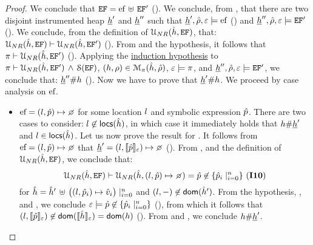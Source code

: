 \begin{proof}
\noindent{} We conclude that $\mathtt{EF} = \mathtt{\text{ef}} \, \uplus \, \mathtt{EF}'$ (). 
We conclude, from , that there are two disjoint instrumented heap $\underline{h}'$ and $\underline{h}''$ 
such that $\underline{h}', \hat\rho, \varepsilon \models \mathtt{\text{ef}}$ () and  $\underline{h}'', \hat\rho, \varepsilon \models \mathtt{EF}'$ (). 
%
We conclude, from the definition 
of ${\cal U}_{NR}(\hat{h}, \mathtt{EF})$, that: ${\cal U}_{NR}(\hat{h}, \mathtt{EF}) \vdash {\cal U}_{NR}(\hat{h}, \mathtt{EF}')$ ().
From  and the hypothesis, it follows that $\pi \vdash {\cal U}_{NR}(\hat{h}, \mathtt{EF}')$ (). 
Applying the \underline{induction hypothesis} to $\pi \vdash {\cal U}_{NR}(\hat{h}, \mathtt{EF}') \, \wedge \,  {\cal S}(\mathtt{EF})$, 
$(h, \rho) \in \mathcal{M}_{\pi}(\hat{h}, \hat\rho)$, $\varepsilon \models \pi$, and 
$\underline{h}'', \hat\rho, \varepsilon \models \mathtt{EF}'$, we conclude that: $\underline{h}'' \# h$ (). 
Now we have to prove that $\underline{h}' \# h$. 
We proceed by case analysis on $\mathtt{\text{ef}}$.  
\begin{itemize}
   \item $\efa = (\loc,\sexprp)\pointsto \none$ for some location $l$ and symbolic expression $\hat{p}$. 
   	    There are two cases to consider:  $l \not\in {\sf locs}(\hat{h})$, in which case 
	    it immediately holds that $h \# \underline{h}'$ and  $l \in {\sf locs}(\hat{h})$. 
	    Let us now prove the result for . 
	    It follows from $\efa = (\loc,\sexprp)\pointsto \none$ that $\iheap' = (\loc, \symbeval{\sexprp}{\senv}) \mapsto \none$ (). 
	    From , and the definition of ${\cal U}_{NR}(\hat{h}, \mathtt{EF})$, 
	    we conclude that: 
	    $$
	       \unificationef{\sheap}{\efs} \vdash \unificationefl{\sheap}{(\loc,\sexprp)\pointsto \none} = \sexprp \not\in \{  \sexprp_i \mid_{i = 0}^n \} \text{ (\ieq{10})} 
	    $$
	    for $\hat{h} = \hat{h}' \, \uplus \, \big((l, \hat{p}_i) \mapsto \hat{v}_i\big)\mid_{i = 0}^n$ and $(l, -) \not\in \mathsf{dom}(\hat{h}')$. 
	    From the hypothesis, , and , we conclude $\varepsilon \models   \hat{p} \not\in \{  \hat{p}_i \mid_{i = 0}^n \}$ (), 
	    from which it follows that $(l, \llbracket \hat{p} \rrbracket_{\varepsilon}) \not\in \mathsf{dom}(\llbracket \hat{h} \rrbracket_{\varepsilon}) = \mathsf{dom}(h)$ (). 
	    From  and , we conclude $h \# \underline{h}'$. 
	    \vspace{4pt}
	    

\end{itemize}
\end{proof}
